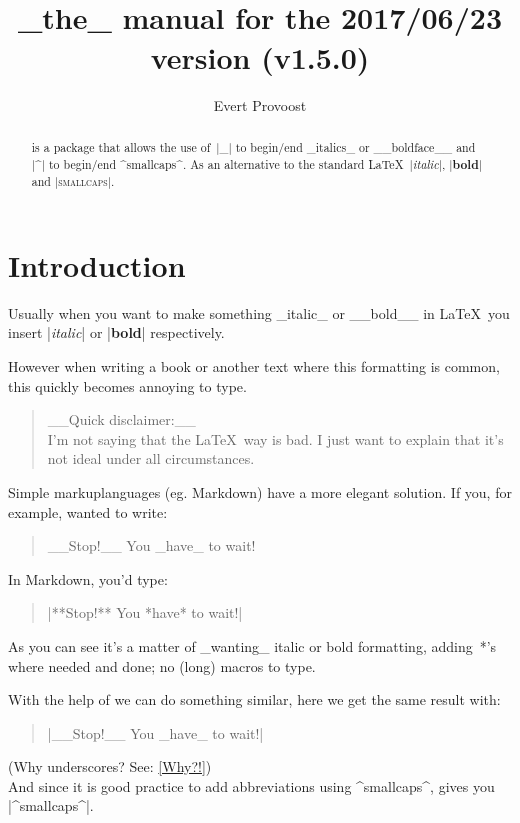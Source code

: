 \documentclass[11pt, cm-default]{l3doc}
\title{\pkg{easyformat}\\[.5em]
		\large _the_ manual for the 2017/06/23 version (v1.5.0)}
\author{Evert Provoost}
\date{}
\begin{document}
	\maketitle
	
	\begin{abstract}
		 is a package that allows the use of~|_| to begin/end
		_italics_ or __boldface__ and |^| to begin/end ^smallcaps^. As an
		alternative to the standard \LaTeX\ |\textit{italic}|, |\textbf{bold}|
		and |\textsc{smallcaps}|.
	\end{abstract}

	\tableofcontents


	\section{Introduction}
	Usually when you want to make something _italic_ or __bold__ in \LaTeX\ you
	insert |\textit{italic}| or |\textbf{bold}| respectively.
	
	However when writing a book or another text where this formatting is common,
	this quickly becomes annoying to type.

	\begin{quote}
	__Quick disclaimer:__\\
	I'm not saying that the \LaTeX\ way is bad. I just want to explain that it's
	not ideal under all circumstances.
	\end{quote}
	
	Simple markuplanguages (eg. Markdown) have a more elegant solution.	
	If you, for example, wanted to write:
	\begin{quote}
		__Stop!__ You _have_ to wait!
	\end{quote}

	In Markdown, you'd type:
	\begin{quote}
		|**Stop!** You *have* to wait!|
	\end{quote}

	As you can see it's a matter of _wanting_ italic or bold formatting, adding~*'s
	where needed and done; no (long) macros to type.
	
	With the help of  we can do something similar, here we get the
	same result with:
	\begin{quote}
		|__Stop!__ You _have_ to wait!|
	\end{quote}
	
	(Why underscores? See: \ref{Why?!})\\
	
	And since it is good practice to add abbreviations using ^smallcaps^,
	 gives you |^smallcaps^|.
	
\end{document}

